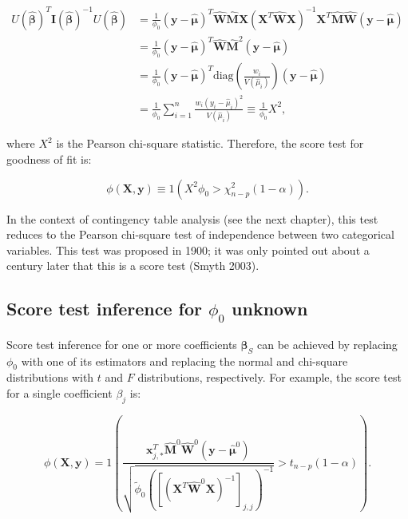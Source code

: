 \documentclass[
  11pt,
  letterpaper,
  oneside]{book}
\theoremstyle{definition}
\theoremstyle{plain}
\theoremstyle{plain}
\theoremstyle{plain}
\theoremstyle{remark}
\begin{document}
\[
\begin{split}
U(\boldsymbol{\widehat{\beta}})^T \boldsymbol{I}(\boldsymbol{\widehat{\beta}})^{-1} U(\boldsymbol{\widehat{\beta}}) &= \frac{1}{\phi_0}(\boldsymbol{y} - \boldsymbol{\widehat{\mu}})^T \boldsymbol{\widehat{W}} \boldsymbol{\widehat{M}} \boldsymbol{X} (\boldsymbol{X}^T \boldsymbol{\widehat{W}} \boldsymbol{X})^{-1} \boldsymbol{X}^T \boldsymbol{\widehat{M}} \boldsymbol{\widehat{W}} (\boldsymbol{y} - \boldsymbol{\widehat{\mu}}) \\
&= \frac{1}{\phi_0}(\boldsymbol{y} - \boldsymbol{\widehat{\mu}})^T \boldsymbol{\widehat{W}} \boldsymbol{\widehat{M}}^2 (\boldsymbol{y} - \boldsymbol{\widehat{\mu}}) \\
&= \frac{1}{\phi_0}(\boldsymbol{y} - \boldsymbol{\widehat{\mu}})^T \text{diag}\left( \frac{w_i}{V(\widehat{\mu}_i)} \right) (\boldsymbol{y} - \boldsymbol{\widehat{\mu}}) \\
&= \frac{1}{\phi_0}\sum_{i=1}^n \frac{w_i (y_i - \widehat{\mu}_i)^2}{V(\widehat{\mu}_i)} \equiv \frac{1}{\phi_0} X^2,
\end{split}
\]

where \(X^2\) is the Pearson chi-square statistic. Therefore, the score
test for goodness of fit is:

\[
\phi(\boldsymbol{X}, \boldsymbol{y}) \equiv 1\left(X^2 \phi_0 > \chi^2_{n-p}(1-\alpha)\right).
\]

In the context of contingency table analysis (see the next chapter),
this test reduces to the Pearson chi-square test of independence between
two categorical variables. This test was proposed in 1900; it was only
pointed out about a century later that this is a score test (Smyth
2003).

\hypertarget{sec-score-test-unknown-dispersion}{%
\subsection{\texorpdfstring{Score test inference for \(\phi_0\)
unknown}{Score test inference for \textbackslash phi\_0 unknown}}\label{sec-score-test-unknown-dispersion}}

Score test inference for one or more coefficients
\(\boldsymbol{\beta}_S\) can be achieved by replacing \(\phi_0\) with
one of its estimators and replacing the normal and chi-square
distributions with \(t\) and \(F\) distributions, respectively. For
example, the score test for a single coefficient \(\beta_j\) is:

\[
\phi(\boldsymbol{X}, \boldsymbol{y}) = 1\left(\frac{\boldsymbol{x}_{j,*}^T \boldsymbol{\widehat{M}}^0 \boldsymbol{\widehat{W}}^0 (\boldsymbol{y} - \boldsymbol{\widehat{\mu}}^0)}{\sqrt{\widetilde{\phi}_0 ([(\boldsymbol{X}^T \boldsymbol{\widehat{W}}^0 \boldsymbol{X})^{-1}]_{j, j})^{-1}}} > t_{n-p}(1-\alpha)\right).
\]
\end{document}
